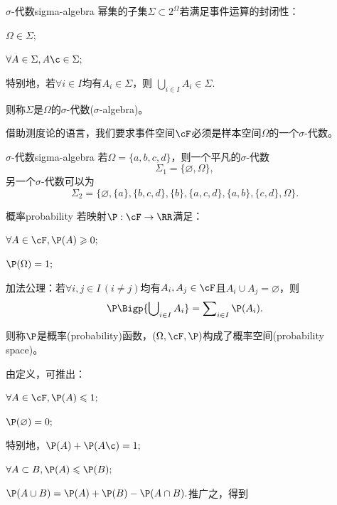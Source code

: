 \begin{definition}{$\sigma$-代数}{sigma-algebra}
	幂集的子集$\Sigma\subset 2^\Omega$若满足事件运算的封闭性：
	\begin{compactenum}
		\item $\Omega \in \Sigma;$
		\item $\forall A \in \Sigma, A\c \in \Sigma;$
		\item 特别地，若$\forall i\in I$均有$A_i \in \Sigma$，则
		$\bigcup\nolimits_{i\in I} A_i \in \Sigma.$
	\end{compactenum}
	则称$\Sigma$是$\Omega$的$\sigma$-代数($\sigma$-algebra)。
\end{definition}

借助测度论的语言，我们要求事件空间$\cF$必须是样本空间$\Omega$的一个$\sigma$-代数。

\begin{example}{$\sigma$-代数}{sigma-algebra}
	若$\Omega=\{a,b,c,d\}$，则一个平凡的$\sigma$-代数
	\[
		\Sigma_1=\{\varnothing, \Omega\},
	\]
	另一个$\sigma$-代数可以为
	\[
		\Sigma_2=\{\varnothing,\{a\},\{b,c,d\},\{b\},\{a,c,d\},\{a,b\},\{c,d\},\Omega\}.
	\]
\end{example}
\begin{definition}{概率}{probability}
	若映射$\P:\cF\to\RR$满足：
	\begin{compactenum}
		\item $\forall A\in\cF,\P(A)\geqslant 0;$
		\item $\P (\Omega)=1;$
		\item 加法公理：若$\forall i,j\in I\,(i\neq j)$均有$A_i,A_j\in\cF$且$A_i\cup A_j=\varnothing$，则
		\begin{equation}
			\P\Bigp{\bigcup\nolimits_{i\in I} A_i}=\sum\nolimits_{i\in I}\P(A_i).
		\end{equation}
	\end{compactenum}
	则称$\P$是概率(probability)函数，$(\Omega,\cF,\P)$构成了概率空间(probability space)。
\end{definition}
\begin{corollary}
	由定义，可推出：
	\begin{compactenum}
		\item $\forall A\in\cF,\P(A)\leqslant 1;$
		\item $\P(\varnothing)=0;$
		\item 
		特别地，$\P(A)+\P(A\c)=1;$
		\item $\forall A\subset B,\P(A)\leqslant\P(B);$
		\item $\P(A\cup B)=\P(A)+\P(B)-\P(A\cap B).$推广之，得到
	\end{compactenum}
\end{corollary}
